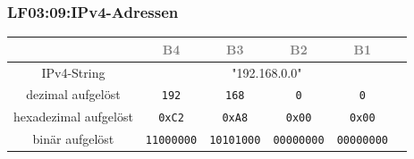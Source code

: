 
\begin{frame}[fragile]  
  \frametitle{LF03:09:IPv4-Adressen}
  \vspace{0.2cm}
  \begin{footnotesize}
  \begin{center}
    \renewcommand{\arraystretch}{1.5}
    \begin{tabular}{|c|c||c|c|c|c|}
    \hline
    &  \textcolor{gray}{\tiny{B4}} & \textcolor{gray}{\tiny{B3}} & \textcolor{gray}{\tiny{B2}} 
    & \textcolor{gray}{\tiny{B1}}  \\
	  \hline
    \hline
    IPv4-String & \multicolumn{4}{c|}{"192.168.0.0"} \\
    \hline
	  dezimal aufgelöst & \texttt{192} & \texttt{168} & \texttt{0} & \texttt{0} \\
    \hline
    hexadezimal aufgelöst & \texttt{0xC2} & \texttt{0xA8} & \texttt{0x00} & \texttt{0x00}\\
    \hline
    binär aufgelöst & \texttt{11000000} & \texttt{10101000} & \texttt{00000000} & \texttt{00000000}\\
    \hline
  \end{tabular}
\end{center}
\end{footnotesize}
\end{frame}


